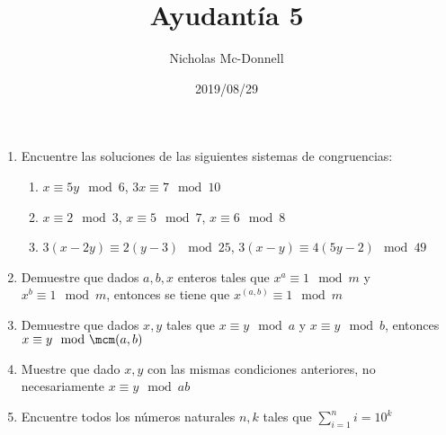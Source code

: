 \documentclass{ayudantia}
\title{Ayudantía 5}
\date{2019/08/29}
\author{Nicholas Mc-Donnell}
\begin{document}
\maketitle
\begin{enumerate}
    \item Encuentre las soluciones de las siguientes sistemas de congruencias:
    \begin{enumerate}
        \item \(x\equiv 5y\mod 6\), \(3x\equiv 7\mod 10\)
        \item \(x\equiv 2\mod 3\), \(x\equiv 5\mod 7\), \(x\equiv 6\mod 8\)
        \item \(3(x-2y)\equiv 2(y-3)\mod 25\), \(3(x-y)\equiv 4(5y-2)\mod 49\)
    \end{enumerate}
    \item Demuestre que dados \(a,b,x\) enteros tales que \(x^a\equiv 1\mod m\) y \(x^b\equiv 1\mod m\), entonces se tiene  que \(x^{(a,b)}\equiv 1\mod m\)
    \item Demuestre que dados \(x,y\) tales que \(x\equiv y\mod a\) y \(x\equiv y\mod b\), entonces \(x\equiv y\mod\mcm(a,b)\)
    \item Muestre que dado \(x,y\) con las mismas condiciones anteriores, no necesariamente \(x\equiv y\mod ab\)
    \item Encuentre todos los números naturales \(n,k\) tales que \(\sum_{i=1}^ni=10^k\)
\end{enumerate}
\end{document}
